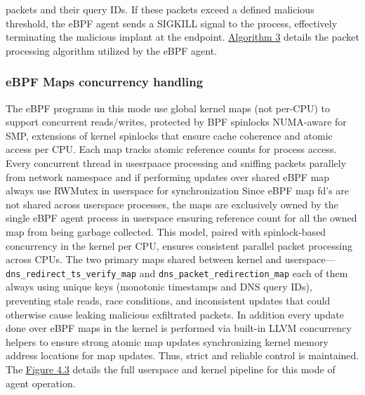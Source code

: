 \documentclass [11pt, proquest] {uwthesis}[2020/02/24]
\begin{document}
packets and their query IDs. If these packets exceed a defined malicious threshold, the eBPF agent sends a SIGKILL signal to the process, effectively terminating the malicious implant at the endpoint.
\hyperref[sec:alg3]{Algorithm 3} details the packet processing algorithm utilized by the eBPF agent.


\subsubsection{\textbf{eBPF Maps concurrency handling}}
\label{active:sec3}
The eBPF programs in this mode use global kernel maps (not per-CPU) to support concurrent reads/writes, protected by BPF spinlocks NUMA-aware for SMP, extensions of kernel spinlocks that ensure cache coherence and atomic access per CPU. Each map tracks atomic reference counts for process access. Every concurrent thread in usesrpaace processing and sniffing packets parallely from network namespace and if performing updates over shared eBPF map always use RWMutex in userspace for synchronization Since eBPF map fd's are not shared across userspace processes, the maps are exclusively owned by the single eBPF agent process in userspace ensuring reference count for all the owned map from being garbage collected. This model, paired with spinlock-based concurrency in the kernel per CPU, ensures consistent parallel packet processing across CPUs. The two primary maps shared between kernel and userspace—\texttt{dns\_redirect\_ts\_verify\_map} and \texttt{dns\_packet\_redirection\_map} each of them always using unique keys (monotonic timestamps and DNS query IDs), preventing stale reads, race conditions, and inconsistent updates that could otherwise cause leaking malicious exfiltrated packets. In addition every update done over eBPF maps in the kernel is performed via built-in LLVM concurrency helpers to ensure strong atomic map updates synchronizing kernel memory address locations for map updates. Thus, strict and reliable control is maintained. The \hyperref[sec:dp-active-phase]{Figure 4.3} details the full userspace and kernel pipeline for this mode of agent operation. 
\end{document}

